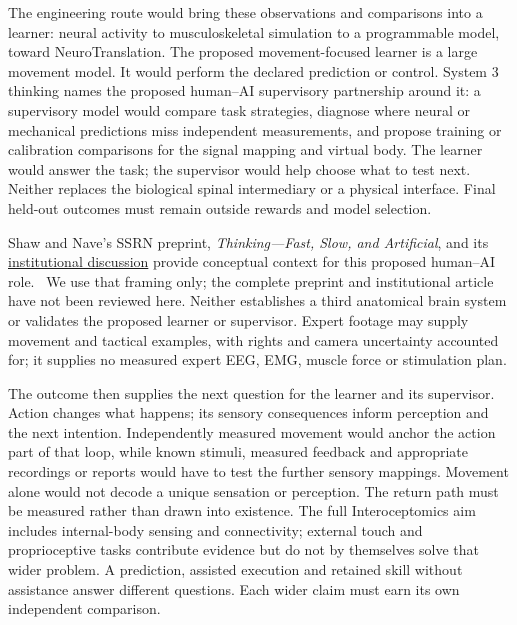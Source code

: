 The engineering route would bring these observations and comparisons into a
learner: neural activity to musculoskeletal simulation to a programmable model,
toward NeuroTranslation. The proposed movement-focused learner is a large
movement model. It would perform the declared prediction or control. System 3
thinking names the proposed human--AI supervisory partnership around it: a
supervisory model would compare task strategies, diagnose where neural or
mechanical predictions miss independent measurements, and propose training or
calibration comparisons for the signal mapping and virtual body. The learner
would answer the task; the supervisor would help choose what to test next.
Neither replaces the biological spinal intermediary or a physical interface.
Final held-out outcomes must remain outside rewards and model selection.
\par\noindent Shaw and Nave's SSRN preprint,
\emph{Thinking---Fast, Slow, and Artificial}, and its
\href{https://executiveeducation.wharton.upenn.edu/thought-leadership/wharton-at-work/2026/05/thinking-fast-slow-and-artificially/}{institutional discussion}
provide conceptual context for this proposed human--AI role.~\cite{shawNaveSystem3Retained}
We use that framing only; the complete preprint and institutional article have
not been reviewed here. Neither establishes a third anatomical brain system or
validates the proposed learner or supervisor. Expert footage may supply movement
and tactical examples, with rights and camera uncertainty accounted for; it
supplies no measured expert EEG, EMG, muscle force or stimulation plan.

The outcome then supplies the next question for the learner and its supervisor.
Action changes what happens; its sensory consequences inform perception and
the next intention. Independently measured movement would anchor the action
part of that loop, while known stimuli, measured feedback and appropriate
recordings or reports would have to test the further sensory mappings. Movement
alone would not decode a unique sensation or perception. The return path must
be measured rather than drawn into existence. The full Interoceptomics aim
includes internal-body sensing and connectivity; external touch and
proprioceptive tasks contribute evidence but do not by themselves solve that
wider problem. A prediction, assisted execution and retained skill without
assistance answer different questions. Each wider claim must earn its own
independent comparison.

